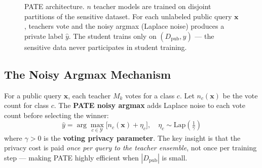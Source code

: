 \begin{figure}[ht]
\caption{PATE architecture. $n$ teacher models are trained on disjoint partitions of the sensitive dataset. For each unlabeled public query $\mathbf{x}$, teachers vote and the noisy argmax (Laplace noise) produces a private label $\hat{y}$. The student trains only on $(D_{\mathrm{pub}}, \hat{y})$ — the sensitive data never participates in student training.}
\label{fig:pate_architecture}
\end{figure}

\subsection{The Noisy Argmax Mechanism}
\label{subsec:pate_mechanism}

For a public query $\mathbf{x}$, each teacher $M_k$ votes for a class $c$. Let $n_c(\mathbf{x})$ be the vote count for class $c$. The \textbf{PATE noisy argmax} adds Laplace noise to each vote count before selecting the winner:
\begin{equation}
  \hat{y} = \arg\max_{c \in \mathcal{Y}} \bigl[ n_c(\mathbf{x}) + \eta_c \bigr], \quad
  \eta_c \sim \text{Lap}\!\left(\tfrac{1}{\gamma}\right)
  \label{eq:pate_noisy_argmax}
\end{equation}
where $\gamma > 0$ is the \textbf{voting privacy parameter}. The key insight is that the privacy cost is paid \emph{once per query to the teacher ensemble}, not once per training step — making PATE highly efficient when $|D_{\mathrm{pub}}|$ is small.

